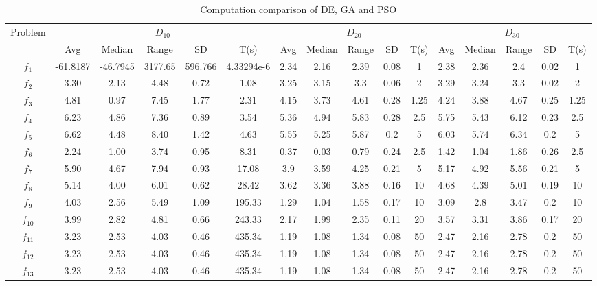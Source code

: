 \documentclass[paper=a4, fontsize=11pt]{scrartcl} %
\numberwithin{equation}{section} %
\numberwithin{figure}{section} %
\numberwithin{table}{section} %
\begin{document}
\begin{sidewaystable}
	\small
	\centering
	\caption{Computation comparison of DE, GA and PSO}
	\label{Tab1d}
	\begin{tabular}{c|ccccc|ccccc|ccccc}
	\noalign{\smallskip}\hline\noalign{\smallskip}
	Problem & \multicolumn{5}{c}{$D_{10}$}& \multicolumn{5}{|c|}{$D_{20}$}
        &  \multicolumn{5}{c}{$D_{30}$} \\ 
	\noalign{\smallskip}\hline\noalign{\smallskip}
		 & Avg & Median & Range & SD & T(s) & Avg & Median
                 & Range & SD & T(s) & Avg & Median & Range & SD &
                 T(s) \\ 
\noalign{\smallskip}\hline\noalign{\smallskip}
			$f_1$ & -61.8187 & -46.7945 & 3177.65 & 596.766 & 4.33294e-6 & 2.34 & 2.16 & 2.39 & 0.08 & 1 & 2.38 & 2.36 & 2.4 & 0.02 & 1 \\ 
			$f_2$ & 3.30 & 2.13 & 4.48 & 0.72 & 1.08 & 3.25 & 3.15 & 3.3 & 0.06 & 2 & 3.29 & 3.24 & 3.3 & 0.02 & 2 \\ 
			$f_3$ & 4.81 & 0.97 & 7.45 & 1.77 & 2.31 & 4.15 & 3.73 & 4.61 & 0.28 & 1.25 & 4.24 & 3.88 & 4.67 & 0.25 & 1.25 \\ 
			$f_4$ & 6.23 & 4.86 & 7.36 & 0.89 & 3.54 & 5.36 & 4.94 & 5.83 & 0.28 & 2.5 & 5.75 & 5.43 & 6.12 & 0.23 & 2.5 \\ 
			$f_5$ & 6.62 & 4.48 & 8.40 & 1.42 & 4.63 & 5.55 & 5.25 & 5.87 & 0.2 & 5 & 6.03 & 5.74 & 6.34 & 0.2 & 5 \\ 
			$f_6$ & 2.24 & 1.00 & 3.74 & 0.95 & 8.31 & 0.37 & 0.03 & 0.79 & 0.24 & 2.5 & 1.42 & 1.04 & 1.86 & 0.26 & 2.5 \\ 
			$f_7$ & 5.90 & 4.67 & 7.94 & 0.93 & 17.08 & 3.9 & 3.59 & 4.25 & 0.21 & 5 & 5.17 & 4.92 & 5.56 & 0.21 & 5 \\ 
			$f_8$ & 5.14 & 4.00 & 6.01 & 0.62 & 28.42 & 3.62 & 3.36 & 3.88 & 0.16 & 10 & 4.68 & 4.39 & 5.01 & 0.19 & 10 \\ 
			$f_9$ & 4.03 & 2.56 & 5.49 & 1.09 & 195.33 & 1.29 & 1.04 & 1.58 & 0.17 & 10 & 3.09 & 2.8 & 3.47 & 0.2 & 10 \\ 
			$f_{10}$ & 3.99 & 2.82 & 4.81 & 0.66 & 243.33 & 2.17 & 1.99 & 2.35 & 0.11 & 20 & 3.57 & 3.31 & 3.86 & 0.17 & 20 \\ 
			$f_{11}$ & 3.23 & 2.53 & 4.03 & 0.46 & 435.34 & 1.19 & 1.08 & 1.34 & 0.08 & 50 & 2.47 & 2.16 & 2.78 & 0.2 & 50 \\ 
			$f_{12}$ & 3.23 & 2.53 & 4.03 & 0.46 & 435.34 & 1.19 & 1.08 & 1.34 & 0.08 & 50 & 2.47 & 2.16 & 2.78 & 0.2 & 50 \\ 
			$f_{13}$ & 3.23 & 2.53 & 4.03 & 0.46 & 435.34 & 1.19 & 1.08 & 1.34 & 0.08 & 50 & 2.47 & 2.16 & 2.78 & 0.2 & 50 \\ 

\end{tabular}
\end{sidewaystable}
\end{document}
